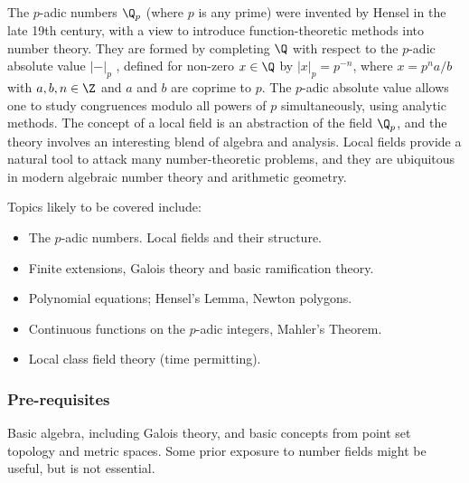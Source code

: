 \documentclass[a4paper]{article}
\begin{document}
\maketitle
{\small
\setlength{\parindent}{0em}
\setlength{\parskip}{1em}

The $p$-adic numbers $\Q_p$ (where $p$ is any prime) were invented by Hensel in the late 19th century, with a view to introduce function-theoretic methods into number theory. They are formed by completing $\Q$ with respect to the $p$-adic absolute value $|-|_p$ , defined for non-zero $x \in \Q$ by $|x|_p = p^{-n}$, where $x = p^n a/b$ with $a, b, n \in \Z$ and $a$ and $b$ are coprime to $p$. The $p$-adic absolute value allows one to study congruences modulo all powers of $p$ simultaneously, using analytic methods. The concept of a local field is an abstraction of the field $\Q_p$, and the theory involves an interesting blend of algebra and analysis. Local fields provide a natural tool to attack many number-theoretic problems, and they are ubiquitous in modern algebraic number theory and arithmetic geometry.

Topics likely to be covered include:
\begin{itemize}[label={}]
  \item The $p$-adic numbers. Local fields and their structure.
  \item Finite extensions, Galois theory and basic ramification theory.
  \item Polynomial equations; Hensel’s Lemma, Newton polygons.
  \item Continuous functions on the $p$-adic integers, Mahler’s Theorem.
  \item Local class field theory (time permitting).
\end{itemize}

\subsubsection*{Pre-requisites}
Basic algebra, including Galois theory, and basic concepts from point set topology and metric spaces. Some prior exposure to number fields might be useful, but is not essential.
}
\tableofcontents
\end{document}
